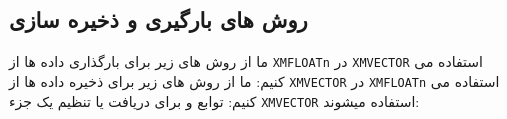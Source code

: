 \subsection{\textbf{روش های بارگیری و ذخیره سازی}}
{
    \Large
    \begin{spacing}{1.5}
        ما از روش های زیر برای بارگذاری داده ها از \texttt{XMFLOATn} در \texttt{XMVECTOR} استفاده می کنیم:
        \textbf{\vspace{4pt}}
        \lr{}
        \textbf{\vspace{3pt}}
        ما از روش های زیر برای ذخیره داده ها از \texttt{XMVECTOR} در \texttt{XMFLOATn} استفاده می کنیم:
        \textbf{\vspace{4pt}}
        \lr{}
        \textbf{\vspace{3pt}}
        توابع  و  برای دریافت یا تنظیم یک جزء \texttt{XMVECTOR} استفاده میشوند:
        \textbf{\vspace{4pt}}
        \lr{}
    \end{spacing}
}

\textbf{\vspace{-65pt}}
